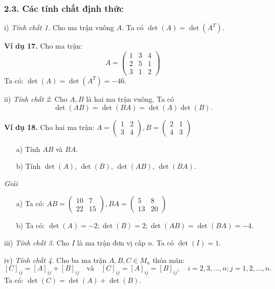 \subsubsection*{2.3. Các tính chất định thức}

i) \textit{Tính chất 1.} Cho ma trận vuông \(A\). Ta có \(\det(A) = \det(A^T)\).

\textbf{Ví dụ 17.} Cho ma trận:
\[
A = \begin{pmatrix}
1 & 3 & 4 \\
2 & 5 & 1 \\
3 & 1 & 2
\end{pmatrix}
\]
Ta có: \(\det(A) = \det(A^T) = -46\).

ii) \textit{Tính chất 2.} Cho \(A, B\) là hai ma trận vuông. Ta có
\[
\det(AB) = \det(BA) = \det(A)\det(B).
\]

\textbf{Ví dụ 18.} Cho hai ma trận: \( A = \begin{pmatrix}
1 & 2 \\
3 & 4
\end{pmatrix}, B = \begin{pmatrix}
2 & 1 \\
4 & 3
\end{pmatrix} \)
\begin{itemize}
    \item[a)] Tính \( AB \) và \( BA \).
    \item[b)] Tính \(\det(A)\), \(\det(B)\), \(\det(AB)\), \(\det(BA)\).
\end{itemize}

\textit{Giải}
\begin{itemize}
    \item[a)] Ta có: \( AB = \begin{pmatrix}
    10 & 7 \\
    22 & 15
    \end{pmatrix}, BA = \begin{pmatrix}
    5 & 8 \\
    13 & 20
    \end{pmatrix} \)
    \item[b)] Ta có: \(\det(A) = -2; \det(B) = 2; \det(AB) = \det(BA) = -4\).
\end{itemize}

iii) \textit{Tính chất 3.} Cho \(I\) là ma trận đơn vị cấp \(n\). Ta có \(\det(I) = 1\).

iv) \textit{Tính chất 4.} Cho ba ma trận \(A, B, C \in M_n\) thỏa mãn:
\[
[C]_{ij} = [A]_{ij} + [B]_{ij} \quad \text{và} \quad [C]_{ij} = [A]_{ij} = [B]_{ij}, \quad i = 2, 3, \ldots, n; j = 1, 2, \ldots, n.
\]
Ta có: \(\det(C) = \det(A) + \det(B)\).

